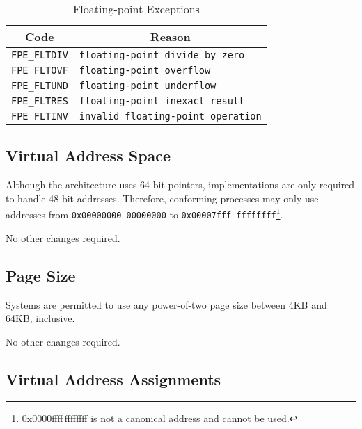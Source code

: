\begin{table}
\Hrule
  \caption{Floating-point Exceptions}
  \begin{center}
    \begin{tabular}[t]{l|l}
      \multicolumn{1}{c}{Code} & \multicolumn{1}{c}{Reason} \\
      \hline
      \texttt{FPE\_FLTDIV} & \texttt{floating-point divide by zero} \\
      \texttt{FPE\_FLTOVF} & \texttt{floating-point overflow} \\
      \texttt{FPE\_FLTUND} & \texttt{floating-point underflow} \\
      \texttt{FPE\_FLTRES} & \texttt{floating-point inexact result} \\
      \texttt{FPE\_FLTINV} & \texttt{invalid floating-point operation}
    \end{tabular}
  \end{center}
\Hrule
\end{table}

\subsection{Virtual Address Space}

Although the \xARCH architecture uses 64-bit pointers, implementations
are only required to handle 48-bit addresses.  Therefore, conforming
processes may only use addresses from \texttt{0x00000000\,00000000} to
\texttt{0x00007fff\,ffffffff}\footnote{0x0000ffff\,ffffffff is not a
  canonical address and cannot be used.}.

No other changes required.

\subsection{Page Size}

Systems are permitted to use any power-of-two page size between 4KB
and 64KB, inclusive.

No other changes required.

\subsection{Virtual Address Assignments}


